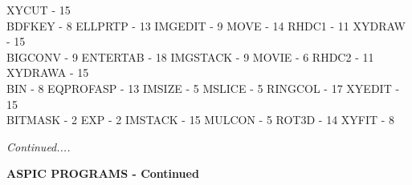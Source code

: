 {\begin{tabbing}
   \>XYCUT - 15                              \\
 BDFKEY - 8                              \>ELLPRTP - 13
   \>IMGEDIT - 9                             \>
 MOVE - 14                               \>RHDC1 - 11
   \>XYDRAW - 15                             \\
 BIGCONV - 9                             \>ENTERTAB - 18
   \>IMGSTACK - 9                            \>
 MOVIE - 6                               \>RHDC2 - 11
   \>XYDRAWA - 15                            \\
 BIN - 8                                 \>EQPROFASP - 13
   \>IMSIZE - 5                              \>
 MSLICE - 5                              \>RINGCOL - 17
   \>XYEDIT - 15                             \\
 BITMASK - 2                             \>EXP - 2
   \>IMSTACK - 15                            \>
 MULCON - 5                              \>ROT3D - 14
   \>XYFIT - 8                               \\
\end{tabbing}
\vspace{20mm}
{\em Continued....}

\newpage
\begin{center}
{\Large\bf ASPIC PROGRAMS - Continued}
\end{center}

}
